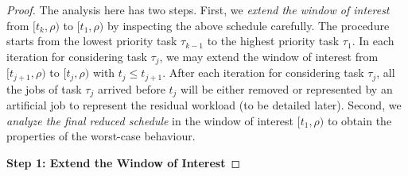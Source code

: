 \begin{proof}
The analysis here has two steps. First, we \emph{extend the window of interest} from $[t_k, \rho)$ to $[t_1, \rho)$ by inspecting the above schedule carefully. The procedure starts from the lowest priority task $\tau_{k-1}$ to the highest priority task $\tau_1$. In each iteration for considering task $\tau_j$, we may extend the window of interest from $[t_{j+1}, \rho)$ to $[t_{j}, \rho)$ with $t_j \leq t_{j+1}$. After each iteration for considering task $\tau_j$, all the jobs of task $\tau_j$ arrived before $t_j$ will be either removed or represented by an artificial job to represent the residual workload (to be detailed later). Second, we \emph{analyze the final reduced schedule} in the window of interest $[t_1, \rho)$ to obtain the properties of the worst-case behaviour.

{\bf Step 1: Extend the Window of Interest} 


\end{proof}
